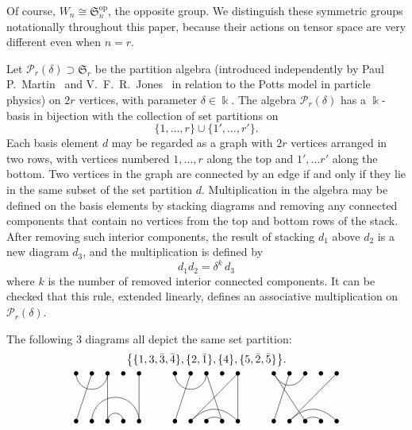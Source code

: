 \documentclass[ALCO,ThmDefs,Unicode,epreuves]{cedram}
\DeclareMathOperator{\op}{op}
\newcommand{\Sym}{\mathfrak{S}}
\newcommand{\Ptn}{\mathcal{P}}
\begin{document}
Of course, $W_n \cong \Sym_n^{\op}$, the opposite group. We distinguish
these symmetric groups notationally throughout this paper, because
their actions on tensor space are very different even when $n=r$.

Let $\Ptn_r(\delta) \supset \Sym_r$ be the partition algebra
(introduced independently by Paul P.~Martin~\cite{Marbook,
 Martin:1994} and V.~F.~R.~Jones~\cite{Jones} in relation to the Potts
model in particle physics) on $2r$ vertices, with parameter $\delta
\in \Bbbk$. The algebra $\Ptn_r(\delta)$ has a $\Bbbk$-basis in
bijection with the collection of set partitions on
\[ \{1, \dots, r\} \cup \{1', \dots, r'\}. \]
Each basis element $d$ may be regarded as a graph with $2r$ vertices
arranged in two rows, with vertices numbered $1, \dots, r$ along the
top and $1', \dots r'$ along the bottom. Two vertices in the graph are
connected by an edge if and only if they lie in the same subset of the
set partition $d$. Multiplication in the algebra may be defined on the
basis elements by stacking diagrams and removing any connected
components that contain no vertices from the top and bottom rows of
the stack. After removing such interior components, the result of
stacking $d_1$ above $d_2$ is a new diagram $d_3$, and the
multiplication is defined by
\begin{equation}\label{eq:Ptn-alg-mult}
 d_1 d_2 = \delta^k \, d_3
\end{equation}
where $k$ is the number of removed interior connected components. It
can be checked that this rule, extended linearly, defines an
associative multiplication on $\Ptn_r(\delta)$. 

\begin{exam}
The following 3 diagrams all depict the same set partition:
\begin{gather*}
\big\{\{1,3,\bar3,\bar4\},\{2,\bar1\},\{4\},\{5,\bar2,\bar5\}\big\}.
\\
\begin{tikzpicture}[scale=0.5]
\foreach \x in {1,...,5}
	{\fill[black] (\x,3) circle (4pt);
	\fill[black] (\x,0) circle (4pt);}
	\draw (1,3) arc (-180:0:1) -- (3,0) arc (180:0:0.5);
	\draw (2,3)--(1,0);
	\draw (2,0) arc (180:0:1.5) -- (5,3);
\end{tikzpicture}\hspace{1cm}
\begin{tikzpicture}[scale=0.5]
\foreach \x in {1,...,5}
	{\fill[black] (\x,3) circle (4pt);
	\fill[black] (\x,0) circle (4pt);}
	\draw (1,3) arc (-180:0:1) -- (4,0) arc (0:180:0.5 and 0.25);
	\draw (2,3)--(1,0);
	\draw (2,0) .. controls (3,1) and (4,1) .. (5,0) -- (5,3) -- (2,0);
\end{tikzpicture}\hspace{1cm}
\begin{tikzpicture}[scale=0.5]
\foreach \x in {1,...,5}
	{\fill[black] (\x,3) circle (4pt);
	\fill[black] (\x,0) circle (4pt);}
	\draw (3,3) .. controls (2.5,2) and (1.5,2) .. (1,3) -- (3,0)
 arc (180:0:0.5 and 0.25);
	\draw (2,3)--(1,0);
	\draw (5,0) .. controls (4,1) and (3,1) .. (2,0) -- (5,3);
\end{tikzpicture}
\end{gather*}
\end{exam}
	
\end{document}
